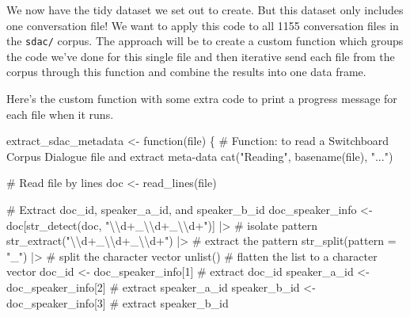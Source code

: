 \documentclass[
  letterpaper,
]{latex/krantz}
\newenvironment{Shaded}{\begin{snugshade}}{\end{snugshade}}
\newcommand{\AttributeTok}[1]{\textcolor[rgb]{0.40,0.45,0.13}{#1}}
\newcommand{\CommentTok}[1]{\textcolor[rgb]{0.37,0.37,0.37}{#1}}
\newcommand{\ControlFlowTok}[1]{\textcolor[rgb]{0.00,0.23,0.31}{#1}}
\newcommand{\DecValTok}[1]{\textcolor[rgb]{0.68,0.00,0.00}{#1}}
\newcommand{\FunctionTok}[1]{\textcolor[rgb]{0.28,0.35,0.67}{#1}}
\newcommand{\NormalTok}[1]{\textcolor[rgb]{0.00,0.23,0.31}{#1}}
\newcommand{\OtherTok}[1]{\textcolor[rgb]{0.00,0.23,0.31}{#1}}
\newcommand{\SpecialCharTok}[1]{\textcolor[rgb]{0.37,0.37,0.37}{#1}}
\newcommand{\StringTok}[1]{\textcolor[rgb]{0.13,0.47,0.30}{#1}}
\begin{document}
We now have the tidy dataset we set out to create. But this dataset only
includes one conversation file! We want to apply this code to all 1155
conversation files in the \texttt{sdac/} corpus. The approach will be to
create a custom function which groups the code we've done for this
single file and then iterative send each file from the corpus through
this function and combine the results into one data frame.

Here's the custom function with some extra code to print a progress
message for each file when it runs.

\begin{Shaded}
\begin{Highlighting}[]
\NormalTok{extract\_sdac\_metadata }\OtherTok{\textless{}{-}} \ControlFlowTok{function}\NormalTok{(file) \{}
  \CommentTok{\# Function: to read a Switchboard Corpus Dialogue file and extract meta{-}data}
  \FunctionTok{cat}\NormalTok{(}\StringTok{"Reading"}\NormalTok{, }\FunctionTok{basename}\NormalTok{(file), }\StringTok{"..."}\NormalTok{)}
  
  \CommentTok{\# Read \textasciigrave{}file\textasciigrave{} by lines}
\NormalTok{  doc }\OtherTok{\textless{}{-}} \FunctionTok{read\_lines}\NormalTok{(file) }
  
  \CommentTok{\# Extract \textasciigrave{}doc\_id\textasciigrave{}, \textasciigrave{}speaker\_a\_id\textasciigrave{}, and \textasciigrave{}speaker\_b\_id\textasciigrave{}}
\NormalTok{  doc\_speaker\_info }\OtherTok{\textless{}{-}} 
\NormalTok{    doc[}\FunctionTok{str\_detect}\NormalTok{(doc, }\StringTok{"}\SpecialCharTok{\textbackslash{}\textbackslash{}}\StringTok{d+\_}\SpecialCharTok{\textbackslash{}\textbackslash{}}\StringTok{d+\_}\SpecialCharTok{\textbackslash{}\textbackslash{}}\StringTok{d+"}\NormalTok{)] }\SpecialCharTok{|\textgreater{}} \CommentTok{\# isolate pattern}
    \FunctionTok{str\_extract}\NormalTok{(}\StringTok{"}\SpecialCharTok{\textbackslash{}\textbackslash{}}\StringTok{d+\_}\SpecialCharTok{\textbackslash{}\textbackslash{}}\StringTok{d+\_}\SpecialCharTok{\textbackslash{}\textbackslash{}}\StringTok{d+"}\NormalTok{) }\SpecialCharTok{|\textgreater{}} \CommentTok{\# extract the pattern}
    \FunctionTok{str\_split}\NormalTok{(}\AttributeTok{pattern =} \StringTok{"\_"}\NormalTok{) }\SpecialCharTok{|\textgreater{}} \CommentTok{\# split the character vector}
    \FunctionTok{unlist}\NormalTok{() }\CommentTok{\# flatten the list to a character vector}
\NormalTok{  doc\_id }\OtherTok{\textless{}{-}}\NormalTok{ doc\_speaker\_info[}\DecValTok{1}\NormalTok{] }\CommentTok{\# extract \textasciigrave{}doc\_id\textasciigrave{}}
\NormalTok{  speaker\_a\_id }\OtherTok{\textless{}{-}}\NormalTok{ doc\_speaker\_info[}\DecValTok{2}\NormalTok{] }\CommentTok{\# extract \textasciigrave{}speaker\_a\_id\textasciigrave{}}
\NormalTok{  speaker\_b\_id }\OtherTok{\textless{}{-}}\NormalTok{ doc\_speaker\_info[}\DecValTok{3}\NormalTok{] }\CommentTok{\# extract \textasciigrave{}speaker\_b\_id\textasciigrave{}}
  

\end{Highlighting}
\end{Shaded}
\end{document}

